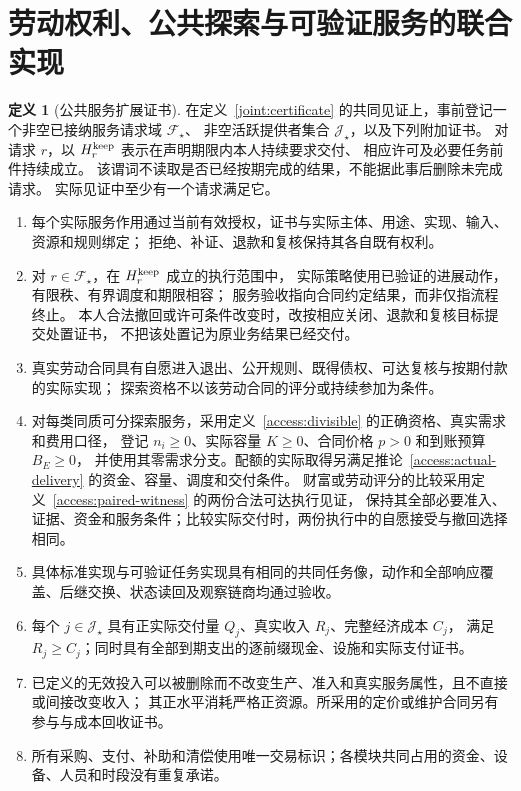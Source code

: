 \documentclass[UTF8,12pt,a4paper,openany,fontset=none,zihao=false]{ctexrep}
\theoremstyle{definition}
\newtheorem{definition}{定义}[chapter]
\newcommand{\1}{\mathbf 1}
\begin{document}
\section{劳动权利、公共探索与可验证服务的联合实现}
\label{joint:service-section}

\begin{definition}[公共服务扩展证书]
\label{joint:service-certificate}
在定义~\ref{joint:certificate} 的共同见证上，事前登记一个非空已接纳服务请求域 \(\mathcal F_\star\)、
非空活跃提供者集合 \(\mathcal J_\star\)，以及下列附加证书。
对请求 \(r\)，以 \(H_r^{\rm keep}\) 表示在声明期限内本人持续要求交付、
相应许可及必要任务前件持续成立。
该谓词不读取是否已经按期完成的结果，不能据此事后删除未完成请求。
实际见证中至少有一个请求满足它。
\begin{enumerate}
\item 每个实际服务作用通过当前有效授权，证书与实际主体、用途、实现、输入、资源和规则绑定；
拒绝、补证、退款和复核保持其各自既有权利。
\item 对 \(r\in\mathcal F_\star\)，在 \(H_r^{\rm keep}\) 成立的执行范围中，
实际策略使用已验证的进展动作，有限秩、有界调度和期限相容；
服务验收指向合同约定结果，而非仅指流程终止。
本人合法撤回或许可条件改变时，改按相应关闭、退款和复核目标提交处置证书，
不把该处置记为原业务结果已经交付。
\item 真实劳动合同具有自愿进入退出、公开规则、既得债权、可达复核与按期付款的实际实现；
探索资格不以该劳动合同的评分或持续参加为条件。
\item 对每类同质可分探索服务，采用定义~\ref{access:divisible} 的正确资格、真实需求和费用口径，
登记 \(n_i\ge0\)、实际容量 \(K\ge0\)、合同价格 \(p>0\) 和到账预算 \(B_E\ge0\)，
并使用其零需求分支。配额的实际取得另满足推论~\ref{access:actual-delivery} 的资金、容量、调度和交付条件。
财富或劳动评分的比较采用定义~\ref{access:paired-witness} 的两份合法可达执行见证，
保持其全部必要准入、证据、资金和服务条件；比较实际交付时，两份执行中的自愿接受与撤回选择相同。
\item 具体标准实现与可验证任务实现具有相同的共同任务像，动作和全部响应覆盖、后继交换、状态读回及观察链商均通过验收。
\item 每个 \(j\in\mathcal J_\star\) 具有正实际交付量 \(Q_j\)、真实收入 \(R_j\)、完整经济成本 \(C_j\)，
满足 \(R_j\ge C_j\)；同时具有全部到期支出的逐前缀现金、设施和实际支付证书。
\item 已定义的无效投入可以被删除而不改变生产、准入和真实服务属性，且不直接或间接改变收入；
其正水平消耗严格正资源。所采用的定价或维护合同另有参与与成本回收证书。
\item 所有采购、支付、补助和清偿使用唯一交易标识；各模块共同占用的资金、设备、人员和时段没有重复承诺。
\end{enumerate}
\end{definition}
\end{document}
